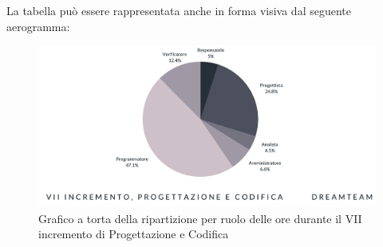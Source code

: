 La tabella può essere rappresentata anche in forma visiva dal seguente aerogramma:
\begin{figure}[H]
\centering
\includegraphics[scale=0.55]{Sezioni/SezioniPreventivo/grafici/Preventivo_torta_progettazione_VII.png}
\caption{Grafico a torta della ripartizione per ruolo delle ore durante il VII incremento di Progettazione e Codifica}
\end{figure}

\pagebreak


